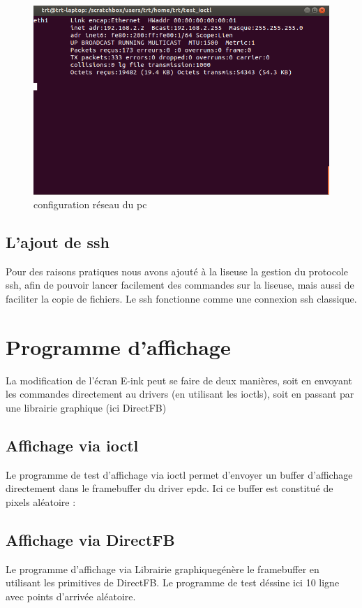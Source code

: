 \begin{figure}[]
	\begin{center}
		\includegraphics[scale=0.5]{capt_pc_ifconfig.png}
	\end{center}
	\caption{configuration réseau du pc}
\end{figure}
\clearpage
\subsection{L'ajout de ssh}
Pour des raisons pratiques nous avons ajouté à la liseuse la gestion du protocole ssh, afin de pouvoir lancer facilement des commandes sur la liseuse, mais aussi de faciliter la copie de fichiers.
Le ssh fonctionne comme une connexion ssh classique.

\section{Programme d'affichage}

La modification de l'écran E-ink peut se faire de deux manières, soit en envoyant les commandes directement au drivers (en utilisant les ioctls), soit en passant par une librairie graphique (ici DirectFB)

\subsection{Affichage via ioctl}

Le programme de test d'affichage via ioctl permet d'envoyer un buffer d'affichage directement dans le framebuffer du driver epdc.
Ici ce buffer est constitué de pixels aléatoire : 

\subsection{Affichage via DirectFB}

Le programme d'affichage via Librairie graphiquegénère le framebuffer en utilisant les primitives de DirectFB.
Le programme de test déssine ici 10 ligne avec points d'arrivée aléatoire.

